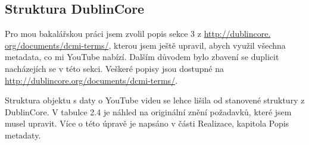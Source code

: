 \subsection{Struktura DublinCore}
\par Pro mou bakalářskou práci jsem zvolil popis sekce 3 z \url{http://dublincore.}\\\url{org/documents/dcmi-terms/}, kterou jsem ještě upravil, abych využil všechna metadata, co mi YouTube nabízí. Dalším důvodem bylo zbavení se duplicit nacházejích se v této sekci. Veškeré popisy jsou dostupné na \url{http://dublincore.org/documents/dcmi-terms/}.
\par Struktura objektu s daty o YouTube videu se lehce lišila od stanovené struktury z DublinCore\cite{dublincoredocementation}. V tabulce 2.4 je náhled na originální znění požadavků, které jsem musel upravit. Více o této úpravě je napsáno v části Realizace, kapitola Popis metadaty.
\vfill
